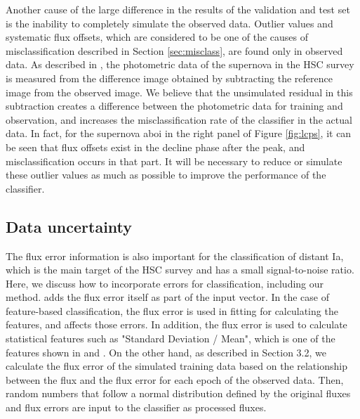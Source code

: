\documentclass[useamsfonts]{pasj01}
\begin{document}
Another cause of the large difference in the results of the validation and test set is the inability to completely simulate the observed data.
Outlier values and systematic flux offsets, which are considered to be one of the causes of misclassification described in Section \ref{sec:misclass}, are found only in observed data.
As described in \citet{yasuda19a}, the photometric data of the supernova in the HSC survey is measured from the difference image obtained by subtracting the reference image from the observed image.
We believe that the unsimulated residual in this subtraction creates a difference between the photometric data for training and observation, and increases the misclassification rate of the classifier in the actual data.
In fact, for the supernova aboi in the right panel of Figure \ref{fig:lcps}, it can be seen that flux offsets exist in the decline phase after the peak, and misclassification occurs in that part.
It will be necessary to reduce or simulate these outlier values as much as possible to improve the performance of the classifier.
%
%
\subsection{Data uncertainty}
%
The flux error information is also important for the classification of distant Ia, which is the main target of the HSC survey and has a small signal-to-noise ratio.
Here, we discuss how to incorporate errors for classification, including our method.
\citet{charnock17a} adds the flux error itself as part of the input vector.
In the case of feature-based classification, the flux error is used in fitting for calculating the features, and affects those errors.
In addition, the flux error is used to calculate statistical features such as "Standard Deviation / Mean", which is one of the features shown in \citet{narayan18a} and \citet{Muthukrishna_2019}.
On the other hand, as described in Section 3.2, we calculate the flux error of the simulated training data based on the relationship between the flux and the flux error for each epoch of the observed data.
Then, random numbers that follow a normal distribution defined by the original fluxes and flux errors are input to the classifier as processed fluxes.
\end{document}
